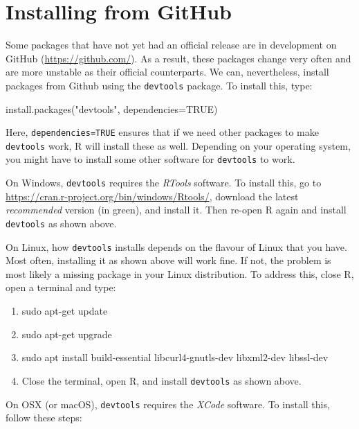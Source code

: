 \documentclass[
]{book}
\newenvironment{Shaded}{\begin{snugshade}}{\end{snugshade}}
\newcommand{\AttributeTok}[1]{\textcolor[rgb]{0.77,0.63,0.00}{#1}}
\newcommand{\ConstantTok}[1]{\textcolor[rgb]{0.00,0.00,0.00}{#1}}
\newcommand{\FunctionTok}[1]{\textcolor[rgb]{0.00,0.00,0.00}{#1}}
\newcommand{\NormalTok}[1]{#1}
\newcommand{\StringTok}[1]{\textcolor[rgb]{0.31,0.60,0.02}{#1}}
\providecommand{\tightlist}{%
  \setlength{\itemsep}{0pt}\setlength{\parskip}{0pt}}
\begin{document}
\hypertarget{installing-from-github}{%
\section{Installing from GitHub}\label{installing-from-github}}

Some packages that have not yet had an official release are in development on GitHub (\url{https://github.com/}). As a result, these packages change very often and are more unstable as their official counterparts. We can, nevertheless, install packages from Github using the \texttt{devtools} package. To install this, type:

\begin{Shaded}
\begin{Highlighting}[]
\FunctionTok{install.packages}\NormalTok{(}\StringTok{"devtools"}\NormalTok{, }\AttributeTok{dependencies=}\ConstantTok{TRUE}\NormalTok{)}
\end{Highlighting}
\end{Shaded}

Here, \texttt{dependencies=TRUE} ensures that if we need other packages to make \texttt{devtools} work, R will install these as well. Depending on your operating system, you might have to install some other software for \texttt{devtools} to work.

On Windows, \texttt{devtools} requires the \emph{RTools} software. To install this, go to \url{https://cran.r-project.org/bin/windows/Rtools/}, download the latest \emph{recommended} version (in green), and install it. Then re-open R again and install \texttt{devtools} as shown above.

On Linux, how \texttt{devtools} installs depends on the flavour of Linux that you have. Most often, installing it as shown above will work fine. If not, the problem is most likely a missing package in your Linux distribution. To address this, close R, open a terminal and type:

\begin{enumerate}
\def\labelenumi{\arabic{enumi}.}
\tightlist
\item
  sudo apt-get update
\item
  sudo apt-get upgrade
\item
  sudo apt install build-essential libcurl4-gnutls-dev libxml2-dev libssl-dev
\item
  Close the terminal, open R, and install \texttt{devtools} as shown above.
\end{enumerate}

On OSX (or macOS), \texttt{devtools} requires the \emph{XCode} software. To install this, follow these steps:
\end{document}
